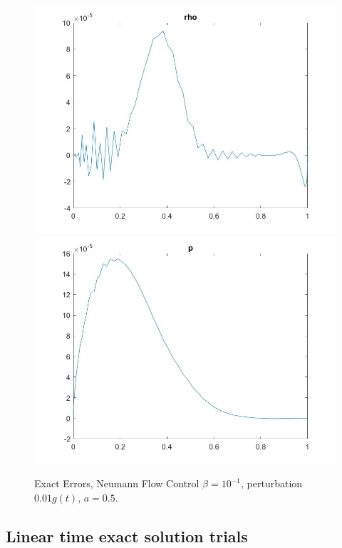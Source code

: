 \documentclass[11pt, a4paper]{article}
\theoremstyle{definition}
\begin{document}
\begin{figure}[h]
	\includegraphics[scale=0.2]{MultNfin1.jpg}
	\includegraphics[scale=0.2]{MultNfin2.jpg}
	\caption{Exact Errors, Neumann Flow Control $\beta = 10^{-1}$, perturbation $0.01g(t)$, $a=0.5$.}
	\label{FigMult2}
\end{figure}

\subsection*{Linear time exact solution trials}
\end{document}
